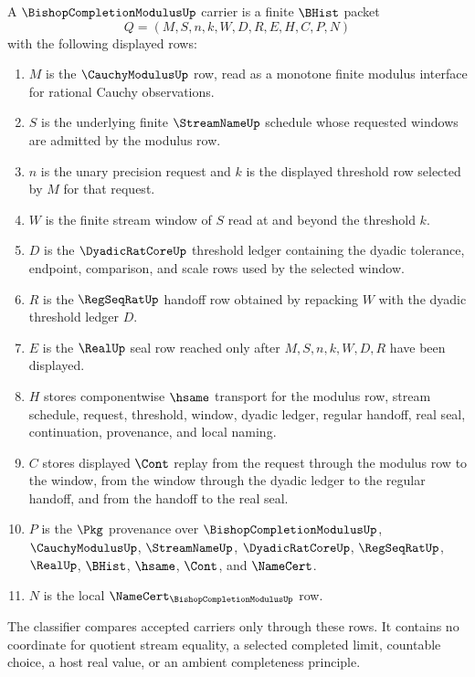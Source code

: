 \begin{definition}
\label{def:bishop-completion-modulus-carrier}
A $\BishopCompletionModulusUp$ carrier is a finite $\BHist$ packet
$$
Q=(M,S,n,k,W,D,R,E,H,C,P,N)
$$
with the following displayed rows:
\begin{enumerate}
\item $M$ is the $\CauchyModulusUp$ row, read as a monotone finite modulus interface for rational Cauchy observations.
\item $S$ is the underlying finite $\StreamNameUp$ schedule whose requested windows are admitted by the modulus row.
\item $n$ is the unary precision request and $k$ is the displayed threshold row selected by $M$ for that request.
\item $W$ is the finite stream window of $S$ read at and beyond the threshold $k$.
\item $D$ is the $\DyadicRatCoreUp$ threshold ledger containing the dyadic tolerance, endpoint, comparison, and scale rows used by the selected window.
\item $R$ is the $\RegSeqRatUp$ handoff row obtained by repacking $W$ with the dyadic threshold ledger $D$.
\item $E$ is the $\RealUp$ seal row reached only after $M,S,n,k,W,D,R$ have been displayed.
\item $H$ stores componentwise $\hsame$ transport for the modulus row, stream schedule, request, threshold, window, dyadic ledger, regular handoff, real seal, continuation, provenance, and local naming.
\item $C$ stores displayed $\Cont$ replay from the request through the modulus row to the window, from the window through the dyadic ledger to the regular handoff, and from the handoff to the real seal.
\item $P$ is the $\Pkg$ provenance over $\BishopCompletionModulusUp$, $\CauchyModulusUp$, $\StreamNameUp$, $\DyadicRatCoreUp$, $\RegSeqRatUp$, $\RealUp$, $\BHist$, $\hsame$, $\Cont$, and $\NameCert$.
\item $N$ is the local $\NameCert_{\BishopCompletionModulusUp}$ row.
\end{enumerate}
The classifier compares accepted carriers only through these rows. It contains no coordinate for quotient stream equality, a selected completed limit, countable choice, a host real value, or an ambient completeness principle.
\end{definition}

